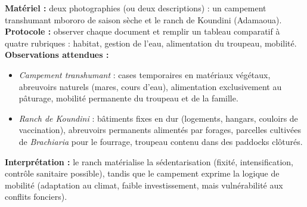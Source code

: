 \documentclass[11pt]{article}
\begin{document}
\begin{experience}
\textbf{Matériel :} deux photographies (ou deux descriptions) : un campement transhumant mbororo de saison sèche et le ranch de Koundini (Adamaoua).
\textbf{Protocole :} observer chaque document et remplir un tableau comparatif à quatre rubriques : habitat, gestion de l'eau, alimentation du troupeau, mobilité.
\textbf{Observations attendues :}
\begin{itemize}
\item \emph{Campement transhumant} : cases temporaires en matériaux végétaux, abreuvoirs naturels (mares, cours d'eau), alimentation exclusivement au pâturage, mobilité permanente du troupeau et de la famille.
\item \emph{Ranch de Koundini} : bâtiments fixes en dur (logements, hangars, couloirs de vaccination), abreuvoirs permanents alimentés par forages, parcelles cultivées de \emph{Brachiaria} pour le fourrage, troupeau contenu dans des paddocks clôturés.
\end{itemize}
\textbf{Interprétation :} le ranch matérialise la sédentarisation (fixité, intensification, contrôle sanitaire possible), tandis que le campement exprime la logique de mobilité (adaptation au climat, faible investissement, mais vulnérabilité aux conflits fonciers).
\end{experience}
\end{document}
